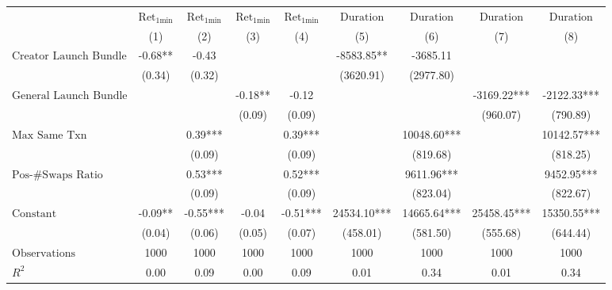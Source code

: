 \begin{tabular}{lcccccccc}
\hline
 & $\text{Ret}_{\text{1min}}$ & $\text{Ret}_{\text{1min}}$ & $\text{Ret}_{\text{1min}}$ & $\text{Ret}_{\text{1min}}$ & $\text{Duration}$ & $\text{Duration}$ & $\text{Duration}$ & $\text{Duration}$ \\
 & (1) & (2) & (3) & (4) & (5) & (6) & (7) & (8)\\
\hline
$\text{Creator Launch Bundle}$ & -0.68** & -0.43 &  &  & -8583.85** & -3685.11 &  &  \\
 & (0.34) & (0.32) &  &  & (3620.91) & (2977.80) &  &  \\
$\text{General Launch Bundle}$ &  &  & -0.18** & -0.12 &  &  & -3169.22*** & -2122.33*** \\
 &  &  & (0.09) & (0.09) &  &  & (960.07) & (790.89) \\
$\text{Max Same Txn}$ &  & 0.39*** &  & 0.39*** &  & 10048.60*** &  & 10142.57*** \\
 &  & (0.09) &  & (0.09) &  & (819.68) &  & (818.25) \\
$\text{Pos-\#Swaps Ratio}$ &  & 0.53*** &  & 0.52*** &  & 9611.96*** &  & 9452.95*** \\
 &  & (0.09) &  & (0.09) &  & (823.04) &  & (822.67) \\
$\text{Constant}$ & -0.09** & -0.55*** & -0.04 & -0.51*** & 24534.10*** & 14665.64*** & 25458.45*** & 15350.55*** \\
 & (0.04) & (0.06) & (0.05) & (0.07) & (458.01) & (581.50) & (555.68) & (644.44) \\
$\text{Observations}$ & 1000 & 1000 & 1000 & 1000 & 1000 & 1000 & 1000 & 1000 \\
$R^2$ & 0.00 & 0.09 & 0.00 & 0.09 & 0.01 & 0.34 & 0.01 & 0.34 \\
\hline
\end{tabular}